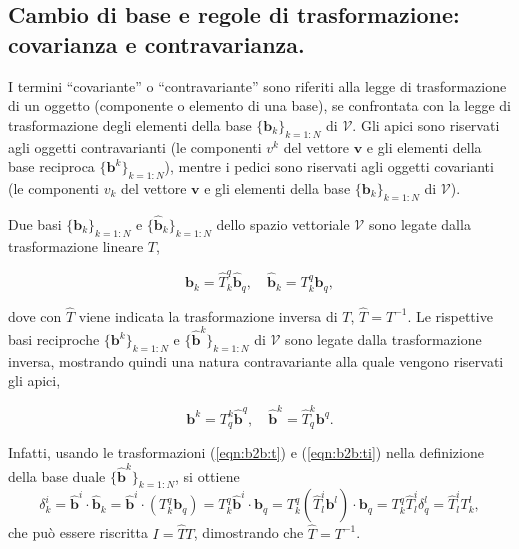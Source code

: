   \subsection{Cambio di base e regole di trasformazione: covarianza e contravarianza.}\label{ch:tensori:cambio_base}
  I termini ``covariante'' o ``contravariante'' sono riferiti alla legge di trasformazione di un oggetto (componente o elemento di una base), se confrontata con la legge di trasformazione degli elementi della base $\{ \bm{b}_k \}_{k=1:N}$ di $\mathcal{V}$.
  Gli apici sono riservati agli oggetti contravarianti (le componenti $v^k$ del vettore $\bm{v}$ e gli elementi della base reciproca $\{ \bm{b}^k \}_{k=1:N}$), mentre i pedici sono riservati agli oggetti covarianti (le componenti $v_k$ del vettore $\bm{v}$ e gli elementi della base $\{ \bm{b}_k \}_{k=1:N}$ di $\mathcal{V}$).
  
  Due basi $\{ \bm{b}_k \}_{k=1:N}$ e $\{ \bm{\hat{b}}_k \}_{k=1:N}$ dello spazio vettoriale $\mathcal{V}$ sono legate dalla trasformazione lineare $T$,
\begin{fBox}
\begin{equation}\label{eqn:b2b:t}
  \bm{b}_k = \hat{T}^q_k \bm{\hat{b}}_q , \quad \bm{\hat{b}}_k = {T}^q_k \bm{b}_q ,
\end{equation}
\end{fBox}
 dove con $\hat{T}$ viene indicata la trasformazione inversa di $T$, $\hat{T} = T^{-1}$. Le rispettive basi reciproche $\{ \bm{b}^k \}_{k=1:N}$ e $\{ \bm{\hat{b}}^k \}_{k=1:N}$ di $\mathcal{V}$ sono legate dalla trasformazione inversa, mostrando quindi una natura contravariante alla quale vengono riservati gli apici,
\begin{fBox}
 \begin{equation}\label{eqn:b2b:ti}
  \bm{b}^k = T^k_q \bm{\hat{b}}^q , \quad \bm{\hat{b}}^k = \hat{T}^k_q \bm{b}^q .
 \end{equation}
\end{fBox}
%
 Infatti, usando le trasformazioni (\ref{eqn:b2b:t}) e (\ref{eqn:b2b:ti}) nella definizione della base duale $\{ \bm{\hat{b}}^k \}_{k=1:N}$, si ottiene
 \begin{equation}
 \delta^i_k = \bm{\hat{b}}^i \cdot \bm{\hat{b}}_k = \bm{\hat{b}}^i \cdot (T^q_k \bm{b}_q) = T^q_k \bm{\hat{b}}^i \cdot \bm{b}_q =
   T^q_k (\hat{T}^i_l \bm{b}^l) \cdot \bm{b}_q = T^q_k \hat{T}^i_l  \delta^l_q =  \hat{T}^i_l T^l_k ,
 \end{equation}
che può essere riscritta $I = \hat{T} T$, dimostrando che $\hat{T} = T^{-1}$.
 
